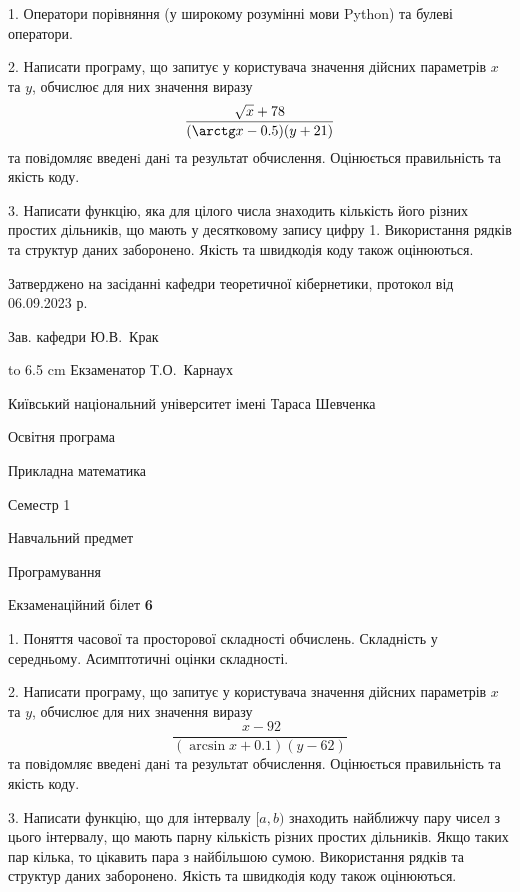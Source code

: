 \documentclass[12pt, ukrainian]{article}
\begin{document}
{%
1. Оператори порівняння (у широкому розумінні мови Python) та булеві оператори.%
\par
2. Написати програму, що запитує у користувача значення дійсних параметрів $x$ та $y$, обчислює для них значення виразу 
$$\frac{\sqrt x + 78}{(\arctg x - 0.5) (y + 21)}$$ 
та повiдомляє введенi данi та результат обчислення.
 Оцінюється правильність та якість коду.

\par
3. Написати функцію, яка для цілого числа знаходить кількість його різних простих дільників, що мають у десятковому запису цифру 1.  Використання рядків та структур даних заборонено. Якість та швидкодія коду також оцінюються. 

}
{\smallskip\smallskip \begin {scriptsize} Затверджено на засіданні кафедри теоретичної кібернетики, протокол   від   06.09.2023 р.\par\smallskip\smallskip\smallskip\smallskip
{\parbox {6.5 cm} {Зав. кафедри \dotfill Ю.В.~Крак}}\hspace {0.7cm} {\hbox to 6.5 cm { Екзаменатор \dotfill Т.О.~Карнаух}} \end{scriptsize}}
\vspace{0.9cm}
{{\begin {scriptsize}\par
{ \center  Київський національний університет імені Тараса Шевченка \par}
{\parbox {5 cm}{Освітня програма \hfill}{\parbox {7 cm}{Прикладна математика\hfill}}\parbox {6 cm}{\hfill Семестр 1}}\par
{\parbox {5 cm} {Навчальний предмет \hfill}\parbox {7 cm}{Програмування \hfill}\parbox {6cm}{\hfill}\par}\vspace{-15pt} \end{scriptsize}}{\center Екзаменаційний білет \No \textbf { 6 }\par}}
{%
1. Поняття часової та просторової складності обчислень. Складність у середньому. Асимптотичні оцінки складності.%
\par
2. Написати програму, що запитує у користувача значення дійсних параметрів $x$ та $y$, обчислює для них значення виразу 
$$\frac{\ x - 92}{(\arcsin x + 0.1) (y - 62)}$$ 
та повiдомляє введенi данi та результат обчислення.
 Оцінюється правильність та якість коду.

\par
3. Написати функцію, що для інтервалу $[a, b)$ знаходить найближчу пару чисел з цього інтервалу, що мають парну кількість різних простих дільників. Якщо таких пар кілька, то цікавить пара з найбільшою сумою.  Використання рядків та структур даних заборонено. Якість та швидкодія коду також оцінюються. 

}
\end{document}
